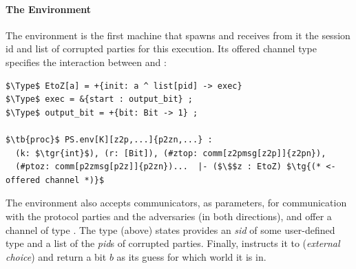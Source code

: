 \paragraph{The Environment}
The environment is the first machine that  spawns and receives from it the session id and list of corrupted parties for this execution.
Its offered channel type  specifies the interaction between  and \Z:
\begin{lstlisting}[basicstyle=\footnotesize\BeraMonottFamily, mathescape, frame=single]
$\Type$ EtoZ[a] = +{init: a ^ list[pid] -> exec} 
$\Type$ exec = &{start : output_bit} ;
$\Type$ output_bit = +{bit: Bit -> 1} ;

$\tb{proc}$ PS.env[K][z2p,...]{p2zn,...} : 
  (k: $\tgr{int}$), (r: [Bit]), (#ztop: comm[z2pmsg[z2p]]{z2pn}), 
  (#ptoz: comm[p2zmsg[p2z]]{p2zn})...  |- ($\$$z : EtoZ) $\tg{(* <- offered channel *)}$
\end{lstlisting}
The environment also accepts communicators, as parameters, for communication with the protocol parties and the adversaries (in both directions), and offer a channel  of type .
The type (above) states \Z provides an \emph{sid} of some user-defined type  and a list of the \emph{pid}s of corrupted parties. 
Finally,  instructs it to  (\emph{external choice}) and return a bit $b$ as its guess for which world it is in.


